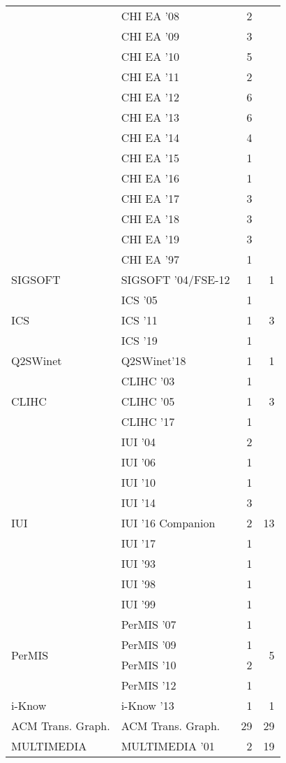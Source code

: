 \begin{table*}[t]
\begin{tabular}{llrr}
& CHI EA '08 & 2 &\\
& CHI EA '09 & 3 &\\
& CHI EA '10 & 5 &\\
& CHI EA '11 & 2 &\\
& CHI EA '12 & 6 &\\
& CHI EA '13 & 6 &\\
& CHI EA '14 & 4 &\\
& CHI EA '15 & 1 &\\
& CHI EA '16 & 1 &\\
& CHI EA '17 & 3 &\\
& CHI EA '18 & 3 &\\
& CHI EA '19 & 3 &\\
& CHI EA '97 & 1 &\\
\multirow{1}{*}{SIGSOFT } & SIGSOFT '04/FSE-12 & 1 & \multirow{1}{*}{1}\\
\multirow{3}{*}{ICS } & ICS '05 & 1 & \multirow{3}{*}{3}\\
& ICS '11 & 1 &\\
& ICS '19 & 1 &\\
\multirow{1}{*}{Q2SWinet} & Q2SWinet'18 & 1 & \multirow{1}{*}{1}\\
\multirow{3}{*}{CLIHC } & CLIHC '03 & 1 & \multirow{3}{*}{3}\\
& CLIHC '05 & 1 &\\
& CLIHC '17 & 1 &\\
\multirow{9}{*}{IUI } & IUI '04 & 2 & \multirow{9}{*}{13}\\
& IUI '06 & 1 &\\
& IUI '10 & 1 &\\
& IUI '14 & 3 &\\
& IUI '16 Companion & 2 &\\
& IUI '17 & 1 &\\
& IUI '93 & 1 &\\
& IUI '98 & 1 &\\
& IUI '99 & 1 &\\
\multirow{4}{*}{PerMIS } & PerMIS '07 & 1 & \multirow{4}{*}{5}\\
& PerMIS '09 & 1 &\\
& PerMIS '10 & 2 &\\
& PerMIS '12 & 1 &\\
\multirow{1}{*}{i-Know } & i-Know '13 & 1 & \multirow{1}{*}{1}\\
\multirow{1}{*}{ACM Trans. Graph.} & ACM Trans. Graph. & 29 & \multirow{1}{*}{29}\\
\multirow{6}{*}{MULTIMEDIA } & MULTIMEDIA '01 & 2 & \multirow{6}{*}{19}\\

\end{tabular}
\end{table*}
